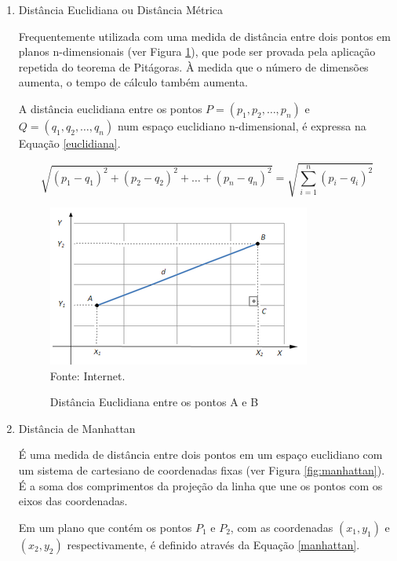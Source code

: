 \begin{enumerate}
    \item Distância Euclidiana ou Distância Métrica
    
    Frequentemente utilizada com uma medida de distância entre dois pontos em planos n-dimensionais (ver Figura \ref{fig:euclidiana}), que pode ser provada pela aplicação repetida do teorema de Pitágoras. À medida que o número de dimensões aumenta, o tempo de cálculo também aumenta.
    
    A distância euclidiana entre os pontos \({P=(p_{1},p_{2},\ldots,p_{n})}\) e \({Q=(q_{1},q_{2},\ldots, q_{n})}\) num espaço euclidiano n-dimensional, é expressa na Equação \ref{euclidiana}.
    
    \begin{equation} \label{euclidiana}
        \sqrt {(p_{1}-q_{1})^{2}+(p_{2}-q_{2})^{2}+\ldots +(p_{n}-q_{n})^{2}}=\sqrt {\sum _{i=1}^{n}(p_{i}-q_{i})^{2}}
    \end{equation}
    
    \begin{figure}[!htb]
       \centering
       \caption{Distância Euclidiana entre os pontos A e B}\label{fig:euclidiana} 
       \includegraphics[scale=0.85]{figuras/euclidiana.png}
       \\Fonte: Internet.
    \end{figure}
    
    \item Distância de Manhattan
    
    É uma medida de distância entre dois pontos em um espaço euclidiano com um sistema de cartesiano de coordenadas fixas (ver Figura \ref{fig:manhattan}). É a soma dos comprimentos da projeção da linha que une os pontos com os eixos das coordenadas.
    
    Em um plano que contém os pontos \({P_{1}}\) e \({P_{2}}\), com as coordenadas \({(x_{1},y_{1})}\) e \({(x_{2},y_{2})}\) respectivamente, é definido através da Equação \ref{manhattan}.
    

\end{enumerate}
